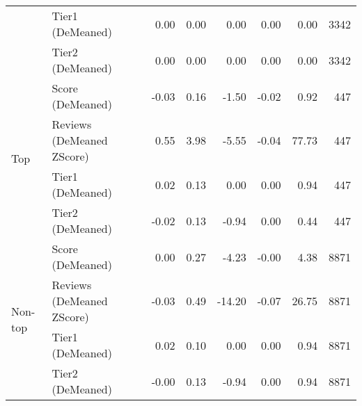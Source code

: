 \begin{longtable}[h!]{llrrrrrr}
        & Tier1 (DeMeaned) &  0.00 &  0.00 &   0.00 &    0.00 &   0.00 &   3342 \\
        & Tier2 (DeMeaned) &  0.00 &  0.00 &   0.00 &    0.00 &   0.00 &   3342 \\
\cline{1-8}
\multirow{4}{*}{Top} & Score (DeMeaned) & -0.03 &  0.16 &  -1.50 &   -0.02 &   0.92 &    447 \\
        & Reviews (DeMeaned ZScore) &  0.55 &  3.98 &  -5.55 &   -0.04 &  77.73 &    447 \\
        & Tier1 (DeMeaned) &  0.02 &  0.13 &   0.00 &    0.00 &   0.94 &    447 \\
        & Tier2 (DeMeaned) & -0.02 &  0.13 &  -0.94 &    0.00 &   0.44 &    447 \\
\cline{1-8}
\multirow{4}{*}{Non-top} & Score (DeMeaned) &  0.00 &  0.27 &  -4.23 &   -0.00 &   4.38 &   8871 \\
        & Reviews (DeMeaned ZScore) & -0.03 &  0.49 & -14.20 &   -0.07 &  26.75 &   8871 \\
        & Tier1 (DeMeaned) &  0.02 &  0.10 &   0.00 &    0.00 &   0.94 &   8871 \\
        & Tier2 (DeMeaned) & -0.00 &  0.13 &  -0.94 &    0.00 &   0.94 &   8871 \\
\end{longtable}
